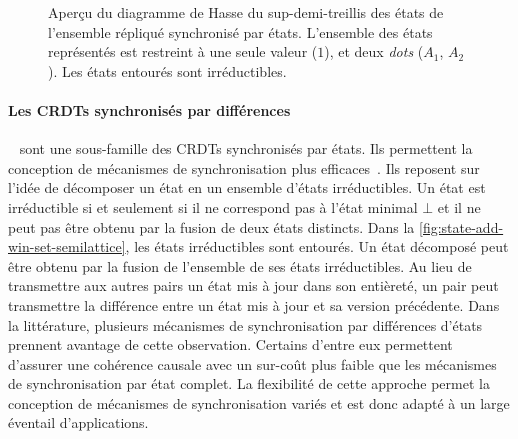 \begin{figure}[tb]
\centering
{}
\caption[Sup-demi-treillis des états de l'ensemble répliqué synchronisé par états]{Aperçu du diagramme de Hasse du sup-demi-treillis des états de l'ensemble répliqué synchronisé par états.
L'ensemble des états représentés est restreint à une seule valeur ($1$), et deux \emph{dots} ($A_1$, $A_2$).
Les états entourés sont irréductibles.
}\label{fig:state-add-win-set-semilattice}
\end{figure}


\paragraph{Les \acp{CRDT} synchronisés par différences}~\autocite{almeida_2018_delta-crdt-revisited} sont une sous-famille des \acp{CRDT} synchronisés par états.
Ils permettent la conception de mécanismes de synchronisation plus efficaces~\autocite{enes_2018_efficient-sync-state-based-crdt}.
Ils reposent sur l'idée de décomposer un état en un ensemble d'états irréductibles.
Un état est irréductible si et seulement si il ne correspond pas à l'état minimal $\bot$ et il ne peut pas être obtenu par la fusion de deux états distincts.
Dans la \autoref{fig:state-add-win-set-semilattice}, les états irréductibles sont entourés.
Un état décomposé peut être obtenu par la fusion de l'ensemble de ses états irréductibles.
Au lieu de transmettre aux autres pairs un état mis à jour dans son entièreté, un pair peut transmettre la différence entre un état mis à jour et sa version précédente.
Dans la littérature, plusieurs mécanismes de synchronisation par différences d'états prennent avantage de cette observation.
Certains d'entre eux permettent d'assurer une cohérence causale avec un sur-coût plus faible que les mécanismes de synchronisation par état complet.
La flexibilité de cette approche permet la conception de mécanismes de synchronisation variés et est donc adapté à un large éventail d'applications.

